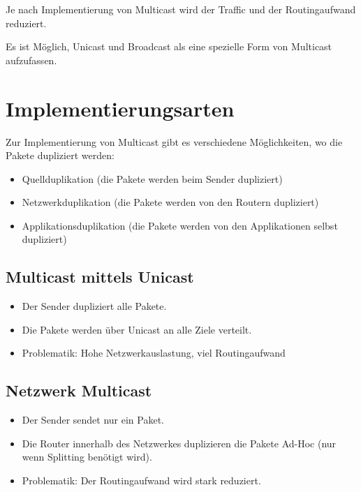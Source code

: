 \documentclass[a4paper, 11pt, accentcolor = tud3b]{tudreport}
\begin{document}
        Je nach Implementierung von Multicast wird der Traffic und der Routingaufwand reduziert.
        
        Es ist Möglich, Unicast und Broadcast als eine spezielle Form von Multicast aufzufassen.

        \section{Implementierungsarten}
            Zur Implementierung von Multicast gibt es verschiedene Möglichkeiten, wo die Pakete dupliziert werden:
            \begin{itemize}
            	\item Quellduplikation (die Pakete werden beim Sender dupliziert)
            	\item Netzwerkduplikation (die Pakete werden von den Routern dupliziert)
            	\item Applikationsduplikation (die Pakete werden von den Applikationen selbst dupliziert)
            \end{itemize}

            \subsection{Multicast mittels Unicast}
                \begin{itemize}
                	\item Der Sender dupliziert alle Pakete.
                	\item Die Pakete werden über Unicast an alle Ziele verteilt.
                	\item Problematik: Hohe Netzwerkauslastung, viel Routingaufwand
                \end{itemize}

            \subsection{Netzwerk Multicast}
                \begin{itemize}
                	\item Der Sender sendet nur ein Paket.
                	\item Die Router innerhalb des Netzwerkes duplizieren die Pakete Ad-Hoc (nur wenn Splitting benötigt wird).
                	\item Problematik: Der Routingaufwand wird stark reduziert.
                \end{itemize}
\end{document}
